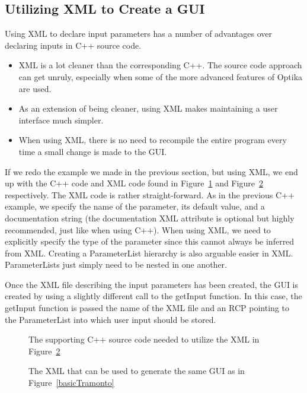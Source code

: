 \subsection{Utilizing XML to Create a GUI}
Using XML to declare input parameters has a number of advantages over declaring inputs in C++ source code.
\begin{itemize}
  \item XML is a lot cleaner than the corresponding C++. The source code approach can get unruly, especially
  when some of the more advanced features of Optika are used.
  \item As an extension of being cleaner, using XML makes maintaining a user interface much simpler.
  \item When using XML, there is no need to recompile the entire program every time a small change is made to the GUI.
\end{itemize}
If we redo the example we made in the previous section, but using XML, we end up with the C++ code and XML code found in
Figure~\ref{basicXMLC++} and Figure~\ref{basicXMLXML} respectively. The XML code is rather straight-forward. As in the previous C++ example, we specify 
the name of the parameter, its default value, and a documentation string (the documentation XML attribute is optional but highly recommended, just like 
when using C++). When using XML, we need to explicitly specify the type
of the parameter since this cannot always be inferred from XML. Creating a ParameterList hierarchy is also arguable easier
in XML. ParameterLists just simply need to be nested in one another.

Once the XML file describing the input parameters has been created, the GUI is created by using a slightly different
call to the getInput function. In this case, the getInput function is passed the name of the XML file and an RCP pointing
to the ParameterList into which user input should be stored.
\begin{figure}
{\footnotesize
\centering
{}
}
\caption{The supporting C++ source code needed to utilize the XML in Figure~\ref{basicXMLXML}}
\label{basicXMLC++}
\end{figure}
\begin{figure}
{\footnotesize
\centering
{}
}
\caption{The XML that can be used to generate the same GUI as in Figure~\ref{basicTramonto}}
\label{basicXMLXML}
\end{figure}

